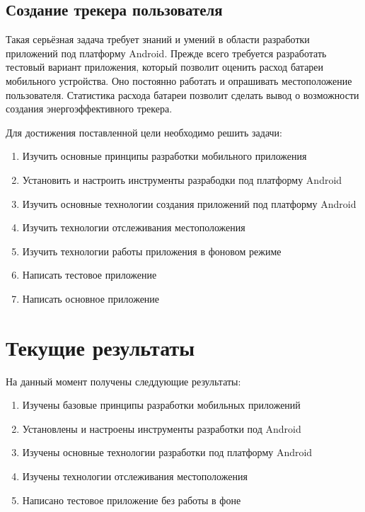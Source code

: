 \documentclass[a4paper,12pt]{article}
\begin{document}
\subsection{Создание трекера пользователя}

Такая серьёзная задача требует знаний и умений в области
разработки приложений под платформу Android. Прежде всего
требуется разработать тестовый вариант приложения, который
позволит оценить расход батареи мобильного устройства. Оно
постоянно работать и опрашивать местоположение пользователя.
Статистика расхода батареи позволит сделать вывод
о возможности создания энергоэффективного трекера.

Для достижения поставленной цели необходимо решить задачи:

\begin{enumerate}
\item Изучить основные принципы разработки мобильного приложения
\item Установить и настроить инструменты разрабодки под платформу Android
\item Изучить основные технологии создания приложений под платформу Android
\item Изучить технологии отслеживания местоположения
\item Изучить технологии работы приложения в фоновом режиме
\item Написать тестовое приложение
\item Написать основное приложение
\end{enumerate}


\pagebreak


\section{Текущие результаты}

На данный момент получены следдующие результаты:

\begin{enumerate}
\item Изучены базовые принципы разработки мобильных приложений
\item Установлены и настроены инструменты разработки под Android
\item Изучены основные технологии разработки под платформу Android
\item Изучены технологии отслеживания местоположения
\item Написано тестовое приложение без работы в фоне
\end{enumerate}
\end{document}

